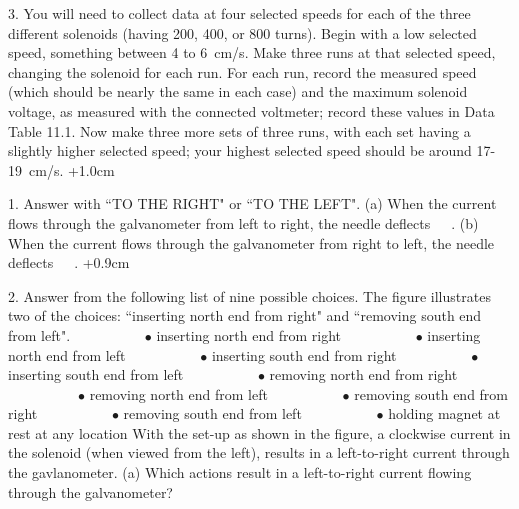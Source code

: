 \item{3.} You will need to collect data at four selected speeds
for each of the three different solenoids (having 200, 400, or
800 turns).  Begin with a low selected speed, something between
4 to 6~cm/s.  Make three runs at that selected speed, changing the
solenoid for each run.  For each run, record the measured speed
(which should be nearly the same in each case) and the maximum
solenoid voltage, as measured with the connected voltmeter; record
these values in Data Table 11.1.  Now make three more sets of three
runs, with each set having a slightly higher selected speed; your
highest selected speed should be around 17-19~cm/s.
\bigskip
{}
\vglue-1.0cm
\vglue-4.7cm
\vglue+1.0cm
\item{1.} Answer with ``TO THE RIGHT" or ``TO THE LEFT".\hfil\break
(a) When the current flows through the galvanometer from\hfil\break
left to right, the needle deflects~~~\underbar{~~~~~~~~~~~~~~~~~~~~~~~~~~}.\hfil\break
(b) When the current flows through the galvanometer from\hfil\break
right to left, the needle deflects~~~\underbar{~~~~~~~~~~~~~~~~~~~~~~~~~~}.
\bigskip
\bigskip
\vglue+0.9cm
\vglue-5.0cm
\vglue-0.9cm
\item{2.} Answer from the following list of nine possible choices. The\hfil\break
figure illustrates two of the choices: ``inserting north end\hfil\break
from right" and ``removing south end from left".\hfil\break
\hbox{~~~~~~~~~~}$\bullet$ inserting north end from right\hfil\break
\hbox{~~~~~~~~~~}$\bullet$ inserting north end from left\hfil\break
\hbox{~~~~~~~~~~}$\bullet$ inserting south end from right\hfil\break
\hbox{~~~~~~~~~~}$\bullet$ inserting south end from left\hfil\break
\hbox{~~~~~~~~~~}$\bullet$ removing north end from right\hfil\break
\hbox{~~~~~~~~~~}$\bullet$ removing north end from left\hfil\break
\hbox{~~~~~~~~~~}$\bullet$ removing south end from right\hfil\break
\hbox{~~~~~~~~~~}$\bullet$ removing south end from left\hfil\break
\hbox{~~~~~~~~~~}$\bullet$ holding magnet at rest at any location\hfil\break
\noindent
With the set-up as shown in the figure, a clockwise current
in the solenoid (when viewed from the left), results in a left-to-right
current through the gavlanometer.\hfil\break
(a) Which actions result in a left-to-right current flowing
through the galvanometer?

